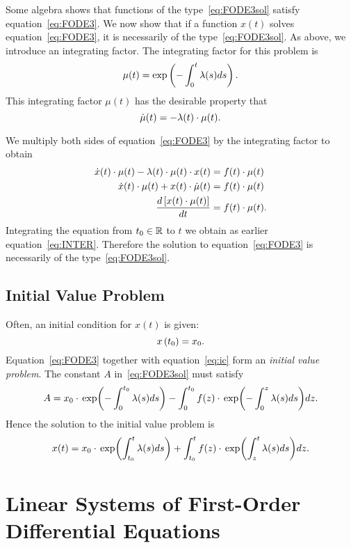 \documentclass[letterpaper,12pt,leqno]{article}
\begin{document}
Some algebra shows that functions of the type~\eqref{eq:FODE3sol} satisfy equation~\eqref{eq:FODE3}. We now show that if a function $x(t)$ solves equation~\eqref{eq:FODE3}, it is necessarily of the type~\eqref{eq:FODE3sol}. As above, we introduce an integrating factor. The integrating factor for this problem is
\begin{equation*}
\mu(t) =\exp \bp{-\int_{0}^{t}\l(s) ds}.
\end{equation*}
This integrating factor $\mu(t)$ has the desirable property that 
\[\dot{\mu}(t) =-\lambda(t) \cdot \mu(t).\]

We multiply both sides of equation~\eqref{eq:FODE3} by the integrating factor to obtain
\begin{align*}
\dot{x}(t) \cdot \mu(t) -\lambda(t) \cdot  \mu(t) \cdot x(t)& =f(t) \cdot \mu(t)\\
\dot{x}(t) \cdot\mu(t) +x(t) \cdot \dot{\mu}(t) &=f(t)\cdot \mu(t)\\
\frac{d \left[ x(t) \cdot \mu(t) \right]}{d t}& =f(t) \cdot\mu(t).
\end{align*}
Integrating the equation from $t_{0}\in \mathbb{R}$ to $t$ we obtain as earlier equation~\eqref{eq:INTER}. Therefore the solution to equation~\eqref{eq:FODE3} is necessarily of the type~\eqref{eq:FODE3sol}.

\subsection{Initial Value Problem}
Often, an initial condition for $x(t) $ is given:
\begin{equation}
x\left( t_{0} \right) =x_{0}.  \label{eq:ic}
\end{equation}
Equation~\eqref{eq:FODE3} together with equation~\eqref{eq:ic} form an \textit{initial value problem}. The constant $A$ in~\eqref{eq:FODE3sol} must satisfy
\[A=x_{0}\cdot \exp{-\int_{0}^{t_{0}}\l(s)ds}-\int_{0}^{t_{0}}f(z) \cdot \exp{-\int_{0}^{z}\l(s)ds} dz.\]
Hence the solution to the initial value problem is
\begin{equation}
x(t) =x_{0}\cdot \exp{\int_{t_{0}}^{t}\l(s)ds}+\int_{t_{0}}^{t}f(z)\cdot \exp{\int_{z}^{t}\l(s)ds}dz.\label{eq:icsol}
\end{equation}

\section{Linear Systems of First-Order Differential Equations}\label{sec:two}
\end{document}
